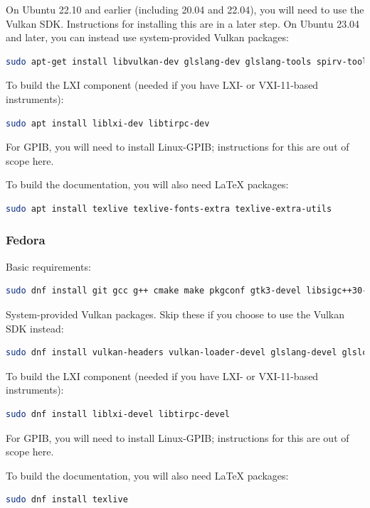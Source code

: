 \begin{enumerate}
On Ubuntu 22.10 and earlier (including 20.04 and 22.04), you will need to use the Vulkan SDK.
Instructions for installing this are in a later step. On Ubuntu 23.04 and later, you can instead
use system-provided Vulkan packages:
\begin{lstlisting}[language=sh, numbers=none]
sudo apt-get install libvulkan-dev glslang-dev glslang-tools spirv-tools glslc
\end{lstlisting}


To build the LXI component (needed if you have LXI- or VXI-11-based instruments):
\begin{lstlisting}[language=sh, numbers=none]
sudo apt install liblxi-dev libtirpc-dev
\end{lstlisting}

For GPIB, you will need to install Linux-GPIB; instructions for this are out of scope here.

To build the documentation, you will also need LaTeX packages:
\begin{lstlisting}[language=sh, numbers=none]
sudo apt install texlive texlive-fonts-extra texlive-extra-utils
\end{lstlisting}


\subsubsection{Fedora}
Basic requirements:
\begin{lstlisting}[language=sh, numbers=none]
sudo dnf install git gcc g++ cmake make pkgconf gtk3-devel libsigc++30-devel yaml-cpp-devel catch-devel glfw-devel hidapi-devel
\end{lstlisting}

System-provided Vulkan packages. Skip these if you choose to use the Vulkan SDK instead:
\begin{lstlisting}[language=sh, numbers=none]
sudo dnf install vulkan-headers vulkan-loader-devel glslang-devel glslc libshaderc-devel spirv-tools-devel
\end{lstlisting}

To build the LXI component (needed if you have LXI- or VXI-11-based instruments):
\begin{lstlisting}[language=sh, numbers=none]
sudo dnf install liblxi-devel libtirpc-devel
\end{lstlisting}

For GPIB, you will need to install Linux-GPIB; instructions for this are out of scope here.

To build the documentation, you will also need LaTeX packages:
\begin{lstlisting}[language=sh, numbers=none]
sudo dnf install texlive
\end{lstlisting}


\end{enumerate}
